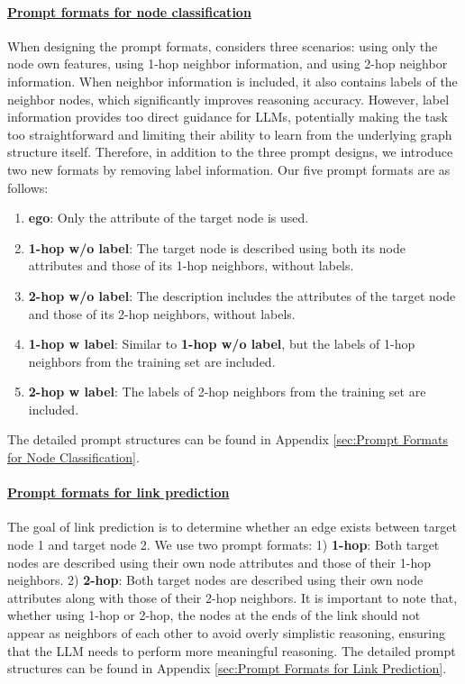 \paragraph{\underline{Prompt formats for node classification}}
When designing the prompt formats, \cite{whenandwhy} considers three scenarios: using only the node own features, using 1-hop neighbor information, and using 2-hop neighbor information. When neighbor information is included, it also contains labels of the neighbor nodes, which significantly improves reasoning accuracy. However, label information provides too direct guidance for LLMs, potentially making the task too straightforward and limiting their ability to learn from the underlying graph structure itself. Therefore, in addition to the three prompt designs, we introduce two new formats by removing label information. Our five prompt formats are as follows:

\begin{enumerate}
    \item \textbf{ego}: Only the attribute of the target node is used.
    \item \textbf{1-hop w/o label}: The target node is described using both its node attributes and those of its 1-hop neighbors, without labels.
    \item \textbf{2-hop w/o label}: The description includes the attributes of the target node and those of its 2-hop neighbors, without labels.
    \item \textbf{1-hop w label}: Similar to \textbf{1-hop w/o label}, but the labels of 1-hop neighbors from the training set are included.
    \item \textbf{2-hop w label}: The labels of 2-hop neighbors from the training set are included.
\end{enumerate}
The detailed prompt structures can be found in Appendix \ref{sec:Prompt Formats for Node Classification}.

\paragraph{\underline{Prompt formats for link prediction}}
The goal of link prediction is to determine whether an edge exists between target node 1 and target node 2. We use two prompt formats: 1) \textbf{1-hop}: Both target nodes are described using their own node attributes and those of their 1-hop neighbors. 2) \textbf{2-hop}: Both target nodes are described using their own node attributes along with those of their 2-hop neighbors. It is important to note that, whether using 1-hop or 2-hop, the nodes at the ends of the link should not appear as neighbors of each other to avoid overly simplistic reasoning, ensuring that the LLM needs to perform more meaningful reasoning. The detailed prompt structures can be found in Appendix \ref{sec:Prompt Formats for Link Prediction}.

